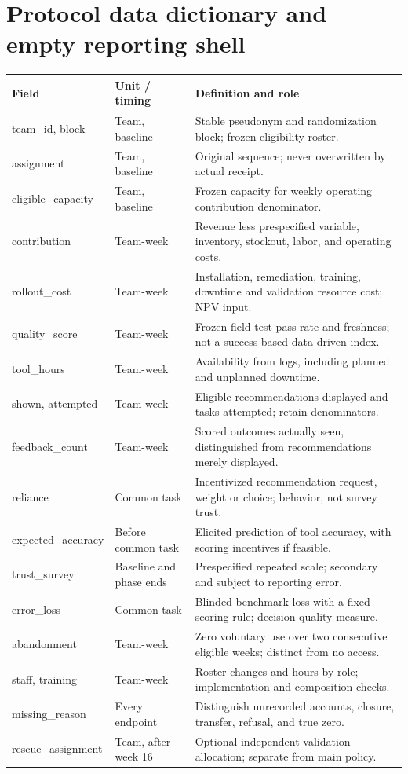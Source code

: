 \documentclass[11pt]{article}
\begin{document}
\section{Protocol data dictionary and empty reporting shell}
\small
\begin{longtable}{p{.20\linewidth}p{.19\linewidth}p{.52\linewidth}}
\toprule Field & Unit / timing & Definition and role\\\midrule\endhead
team\_id, block & Team, baseline & Stable pseudonym and randomization block; frozen eligibility roster.\\
assignment & Team, baseline & Original sequence; never overwritten by actual receipt.\\
eligible\_capacity & Team, baseline & Frozen capacity for weekly operating contribution denominator.\\
contribution & Team-week & Revenue less prespecified variable, inventory, stockout, labor, and operating costs.\\
rollout\_cost & Team-week & Installation, remediation, training, downtime and validation resource cost; NPV input.\\
quality\_score & Team-week & Frozen field-test pass rate and freshness; not a success-based data-driven index.\\
tool\_hours & Team-week & Availability from logs, including planned and unplanned downtime.\\
shown, attempted & Team-week & Eligible recommendations displayed and tasks attempted; retain denominators.\\
feedback\_count & Team-week & Scored outcomes actually seen, distinguished from recommendations merely displayed.\\
reliance & Common task & Incentivized recommendation request, weight or choice; behavior, not survey trust.\\
expected\_accuracy & Before common task & Elicited prediction of tool accuracy, with scoring incentives if feasible.\\
trust\_survey & Baseline and phase ends & Prespecified repeated scale; secondary and subject to reporting error.\\
error\_loss & Common task & Blinded benchmark loss with a fixed scoring rule; decision quality measure.\\
abandonment & Team-week & Zero voluntary use over two consecutive eligible weeks; distinct from no access.\\
staff, training & Team-week & Roster changes and hours by role; implementation and composition checks.\\
missing\_reason & Every endpoint & Distinguish unrecorded accounts, closure, transfer, refusal, and true zero.\\
rescue\_assignment & Team, after week 16 & Optional independent validation allocation; separate from main policy.\\
\bottomrule
\end{longtable}
\end{document}
